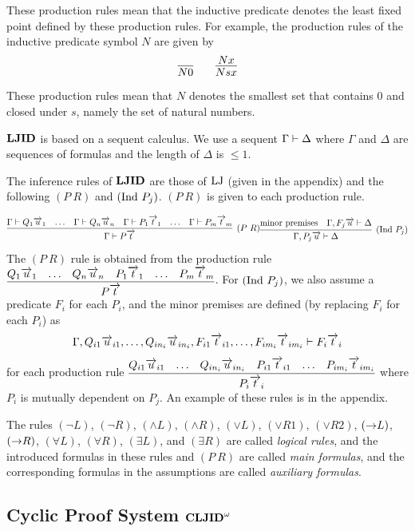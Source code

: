 These production rules mean that 
the inductive predicate denotes 
the least fixed point defined by these production rules.
%
For example, 
the production rules of the inductive predicate symbol $N$ are given by
\[
\infer{N0}{}
\qquad
\infer{Ns x}{Nx}
\]
These production rules mean that 
$N$ denotes the smallest set that contains 0 and closed under $s$,
namely the set of natural numbers.

${\bf LJID}$ is based on a sequent calculus.
We use a sequent $\Gamma \mathrel \vdash \Delta$ where $\Gamma$ and $\Delta$
are sequences of formulas and
the length of $\Delta$ is $\le 1$.

The inference rules of ${\bf LJID}$ are those of ${\rm LJ}$ (given in the appendix)
and the following $(P\ R)$ and $({\rm Ind}\ P_j)$.
$(P\ R)$ is given to each production rule.

{\prooflineskip
\[
\infer[(P\ R)]{\Gamma \prove P\Vec t}{
\Gamma \prove Q_{1}\Vec u_{1} & \ldots & \Gamma \prove Q_{n}\Vec u_{n}
& \Gamma \prove P_1\Vec t_{1} & \ldots & \Gamma \prove P_{m}\Vec t_{m}
}
\\
\infer[(\Ind\ P_j)]{\Gamma,P_j\Vec u \prove \Delta}{
\hbox{minor premises}
&
\Gamma,F_j\Vec u \prove \Delta
}
\]
}
The $(P\ R)$ rule is obtained from the production rule
$\vcenter{
\infer{P\Vec t}{Q_1\Vec u_1 & \ldots & Q_n\Vec u_n & P_1\Vec t_1 & \ldots & P_m\Vec t_m}
}$.
For $({\rm Ind}\ P_j)$, we also assume 
a predicate $F_i$ for each $P_i$,
and
the minor premises are defined (by replacing $F_i$ for each $P_i$) as 
\[
\Gamma, Q_{i1}\overrightarrow u_{i1}, \ldots, Q_{in_i}\overrightarrow u_{in_i}, 
F_{i1}\overrightarrow t_{i1}, \ldots, F_{im_i}\overrightarrow t_{im_i}
\mathrel \vdash F_i\overrightarrow t_i
\]
for each production rule
$\vcenter{
\infer{P_i\Vec t_i}{Q_{i1}\Vec u_{i1} & \ldots & Q_{in_i}\Vec u_{in_i} & P_{i1}\Vec t_{i1} & \ldots & P_{im_i}\Vec t_{im_i}}
}$
where $P_i$ is mutually dependent on $P_j$.
An example of these rules is in the appendix.

The rules $(\neg L)$, $(\neg R)$,
$(\land L)$, $(\land R)$,
$(\lor L)$, $(\lor R1)$, $(\lor R2)$, 
$(\mathbin \to L)$, $(\mathbin \to R)$,
$(\forall L)$, $(\forall R)$,
$(\exists L)$, and $(\exists R)$
are called {\em logical rules}, and
the introduced formulas in these rules and $(P\ R)$
are called {\em main formulas},
and the corresponding formulas in the assumptions are called {\em auxiliary
formulas}.

\subsection{Cyclic Proof System ${{\bf CLJID}^\omega}$}

